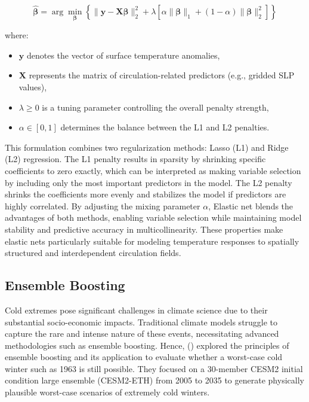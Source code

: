 \documentclass[
]{krantz}
\providecommand{\tightlist}{%
  \setlength{\itemsep}{0pt}\setlength{\parskip}{0pt}}
\begin{document}
\[
\hat{\boldsymbol{\beta}} = \arg\min_{\boldsymbol{\beta}} \left\{ \| \mathbf{y} - \mathbf{X} \boldsymbol{\beta} \|_2^2 + \lambda \left[ \alpha \| \boldsymbol{\beta} \|_1 + (1 - \alpha) \| \boldsymbol{\beta} \|_2^2 \right] \right\}
\]

where:

\begin{itemize}
\tightlist
\item
  \(\mathbf{y}\) denotes the vector of surface temperature anomalies,\\
\item
  \(\mathbf{X}\) represents the matrix of circulation-related predictors (e.g., gridded SLP values),\\
\item
  \(\lambda \geq 0\) is a tuning parameter controlling the overall penalty strength,\\
\item
  \(\alpha \in [0, 1]\) determines the balance between the L1 and L2 penalties.
\end{itemize}

This formulation combines two regularization methods: Lasso (L1) and Ridge (L2) regression. The L1 penalty results in sparsity by shrinking specific coefficients to zero exactly, which can be interpreted as making variable selection by including only the most important predictors in the model. The L2 penalty shrinks the coefficients more evenly and stabilizes the model if predictors are highly correlated. By adjusting the mixing parameter \(\alpha\), Elastic net blends the advantages of both methods, enabling variable selection while maintaining model stability and predictive accuracy in multicollinearity. These properties make elastic nets particularly suitable for modeling temperature responses to spatially structured and interdependent circulation fields.

\subsection{Ensemble Boosting}\label{ensemble-boosting}

Cold extremes pose significant challenges in climate science due to their substantial socio-economic impacts. Traditional climate models struggle to capture the rare and intense nature of these events, necessitating advanced methodologies such as ensemble boosting. Hence, (\citet{sippel2024}) explored the principles of ensemble boosting and its application to evaluate whether a worst-case cold winter such as 1963 is still possible. They focused on a 30-member CESM2 initial condition large ensemble (CESM2-ETH) from 2005 to 2035 to generate physically plausible worst-case scenarios of extremely cold winters.
\end{document}
